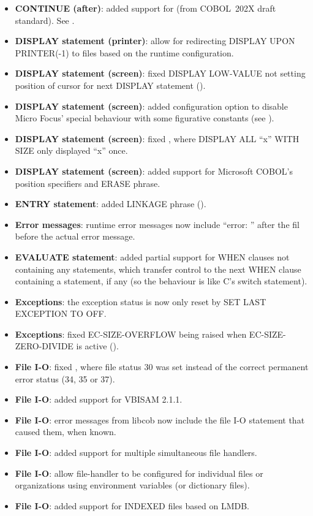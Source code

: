 \begin{itemize}
\item \textbf{CONTINUE (after)}: added support for (from COBOL~202X draft standard). See .
\item \textbf{DISPLAY statement (printer)}: allow for redirecting DISPLAY UPON PRINTER(-1) to files based on the runtime configuration.
\item \textbf{DISPLAY statement (screen)}: fixed DISPLAY LOW-VALUE not setting position of cursor for next DISPLAY statement ().
\item \textbf{DISPLAY statement (screen)}: added configuration option to disable Micro Focus' special behaviour with some figurative constants (see ).
\item \textbf{DISPLAY statement (screen)}: fixed , where DISPLAY ALL ``x'' WITH SIZE only displayed ``x'' once.
\item \textbf{DISPLAY statement (screen)}: added support for Microsoft COBOL's position specifiers and ERASE phrase.
\item \textbf{ENTRY statement}: added LINKAGE phrase ().
\item \textbf{Error messages}: runtime error messages now include ``error: '' after the fil before the actual error message.
\item \textbf{EVALUATE statement}: added partial support for WHEN clauses not containing any statements, which transfer control to the next WHEN clause containing a statement, if any (so the behaviour is like C's switch statement).
\item \textbf{Exceptions}: the exception status is now only reset by SET LAST EXCEPTION TO OFF.
\item \textbf{Exceptions}: fixed EC-SIZE-OVERFLOW being raised when EC-SIZE-ZERO-DIVIDE is active ().
\item \textbf{File I-O}: fixed , where file status 30 was set instead of the correct permanent error status (34, 35 or 37).
\item \textbf{File I-O}: added support for VBISAM 2.1.1.
\item \textbf{File I-O}: error messages from libcob now include the file I-O statement that caused them, when known.
\item \textbf{File I-O}: added support for multiple simultaneous file handlers.
\item \textbf{File I-O}: allow file-handler to be configured for individual files or organizations using environment variables (or dictionary files).
\item \textbf{File I-O}: added support for INDEXED files based on LMDB.

\end{itemize}
